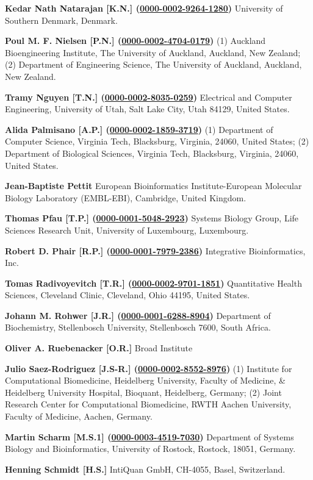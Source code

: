 \documentclass{sbml-paper}
\newcommand{\orcid}[1]{\href{https://orcid.org/#1}{#1}}
\begin{document}
\textbf{Kedar Nath Natarajan [K.N.] (\orcid{0000-0002-9264-1280})} University of Southern Denmark, Denmark.

\textbf{Poul M. F. Nielsen [P.N.] (\orcid{0000-0002-4704-0179})} (1) Auckland Bioengineering Institute, The University of Auckland, Auckland, New Zealand; (2) Department of Engineering Science, The University of Auckland, Auckland, New Zealand.

\textbf{Tramy Nguyen [T.N.] (\orcid{0000-0002-8035-0259})} Electrical and Computer Engineering, University of Utah, Salt Lake City, Utah 84129, United States.

\textbf{Alida Palmisano [A.P.] (\orcid{0000-0002-1859-3719})} (1) Department of Computer Science, Virginia Tech, Blacksburg, Virginia, 24060,  United States; (2) Department of Biological Sciences, Virginia Tech, Blacksburg, Virginia, 24060, United States.

\textbf{Jean-Baptiste Pettit} European Bioinformatics Institute-European Molecular Biology Laboratory (EMBL-EBI), Cambridge, United Kingdom.

\textbf{Thomas Pfau [T.P.] (\orcid{0000-0001-5048-2923})} Systems Biology Group, Life Sciences Research Unit, University of Luxembourg, Luxembourg.

\textbf{Robert D. Phair [R.P.] (\orcid{0000-0001-7979-2386})} Integrative Bioinformatics, Inc.

\textbf{Tomas Radivoyevitch [T.R.] (\orcid{0000-0002-9701-1851})} Quantitative Health Sciences, Cleveland Clinic, Cleveland, Ohio 44195, United States.

\textbf{Johann M. Rohwer [J.R.] (\orcid{0000-0001-6288-8904})} Department of Biochemistry, Stellenbosch University, Stellenbosch 7600, South Africa.

\textbf{Oliver A. Ruebenacker [O.R.]} Broad Institute

\textbf{Julio Saez-Rodriguez [J.S-R.] (\orcid{0000-0002-8552-8976})} (1) Institute for Computational Biomedicine, Heidelberg University, Faculty of Medicine, \& Heidelberg University Hospital, Bioquant, Heidelberg, Germany; (2) Joint Research Center for Computational Biomedicine, RWTH Aachen University, Faculty of Medicine, Aachen, Germany.

\textbf{Martin Scharm [M.S.1] (\orcid{0000-0003-4519-7030})} Department of Systems Biology and Bioinformatics, University of Rostock, Rostock, 18051, Germany.

\textbf{Henning Schmidt [H.S.]} IntiQuan GmbH, CH-4055, Basel, Switzerland.
\end{document}

